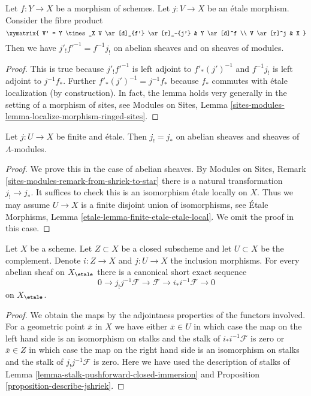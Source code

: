 \begin{lemma}
\label{lemma-shriek-base-change}
Let $f: Y \to X$ be a morphism of schemes. Let $j: V \to X$ be an \'etale
morphism. Consider the fibre product
$$
\xymatrix{
V' = Y \times_X V \ar[d]_{f'} \ar[r]_-{j'} & Y \ar[d]^f \\
V \ar[r]^j & X
}
$$
Then we have $j'_! f'^{-1} = f^{-1} j_!$ on abelian sheaves and on
sheaves of modules.
\end{lemma}

\begin{proof}
This is true because $j'_! f'^{-1}$ is left adjoint to
$f'_* (j')^{-1}$ and $f^{-1} j_!$ is left adjoint to $j^{-1}f_*$.
Further $f'_* (j')^{-1} = j^{-1}f_*$ because $f_*$ commutes with
\'etale localization (by construction). In fact, the lemma holds very generally
in the setting of a morphism of sites, see
Modules on Sites, Lemma
\ref{sites-modules-lemma-localize-morphism-ringed-sites}.
\end{proof}

\begin{lemma}
\label{lemma-shriek-equals-star-finite-etale}
Let $j : U \to X$ be finite and \'etale. Then $j_! = j_*$
on abelian sheaves and sheaves of $\Lambda$-modules.
\end{lemma}

\begin{proof}
We prove this in the case of abelian sheaves.
By Modules on Sites, Remark \ref{sites-modules-remark-from-shriek-to-star}
there is a natural transformation $j_! \to j_*$.
It suffices to check this is an isomorphism \'etale locally
on $X$. Thus we may assume $U \to X$ is a finite disjoint union
of isomorphisms, see
\'Etale Morphisms, Lemma \ref{etale-lemma-finite-etale-etale-local}.
We omit the proof in this case.
\end{proof}

\begin{lemma}
\label{lemma-ses-associated-to-open}
Let $X$ be a scheme. Let $Z \subset X$ be a closed subscheme and let
$U \subset X$ be the complement. Denote $i : Z \to X$ and $j : U \to X$
the inclusion morphisms. For every abelian sheaf on $X_\etale$
there is a canonical short exact sequence
$$
0 \to j_!j^{-1}\mathcal{F} \to \mathcal{F} \to i_*i^{-1}\mathcal{F} \to 0
$$
on $X_\etale$.
\end{lemma}

\begin{proof}
We obtain the maps by the adjointness properties of the functors
involved. For a geometric point $\overline{x}$ in $X$ we have either
$\overline{x} \in U$ in which case the map on the left hand side
is an isomorphism on stalks and the stalk of $i_*i^{-1}\mathcal{F}$
is zero or $\overline{x} \in Z$ in which case the map on the right hand side
is an isomorphism on stalks and the stalk of $j_!j^{-1}\mathcal{F}$
is zero. Here we have used the description of stalks of
Lemma \ref{lemma-stalk-pushforward-closed-immersion} and
Proposition \ref{proposition-describe-jshriek}.
\end{proof}








